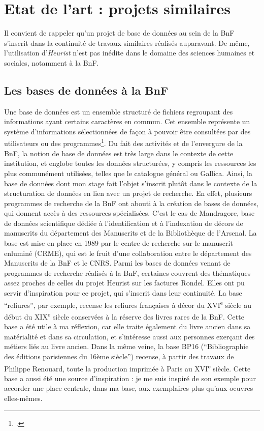 \chapter{Etat de l'art : projets similaires}

Il convient de rappeler qu'un projet de base de données au sein de la BnF s'inscrit dans la continuité de travaux similaires réalisés auparavant. De même, l'utilisation d'\emph{Heurist} n'est pas inédite dans le domaine des sciences humaines et sociales, notamment à la BnF. 


\section{Les bases de données à la BnF}

Une base de données est un ensemble structuré de fichiers regroupant des informations ayant certains caractères en commun. Cet ensemble représente un système d'informations sélectionnées de façon à pouvoir être consultées par des utilisateurs ou des programmes\footcite{BDD_def}. Du fait des activités et de l'envergure de la BnF, la notion de base de données est très large dans le contexte de cette institution, et englobe toutes les données structurées, y compris les ressources les plus communément utilisées, telles que le catalogue général ou Gallica.  
Ainsi, la base de données dont mon stage fait l'objet s'inscrit plutôt dans le contexte de la structuration de données en lien avec un projet de recherche. En effet, plusieurs programmes de recherche de la BnF ont abouti à la création de bases de données, qui donnent accès à des ressources spécialisées. C'est le cas de Mandragore, base de données scientifique dédiée à l’identification et à l'indexation de décors de manuscrits du département des Manuscrits et de la Bibliothèque de l’Arsenal. La base est mise en place en 1989 par le centre de recherche sur le manuscrit enluminé (CRME), qui est le fruit d'une collaboration entre le département des Manuscrits de la BnF et le CNRS. 
Parmi les bases de données venant de programmes de recherche réalisés à la BnF, certaines couvrent des thématiques assez proches de celles du projet Heurist sur les factures Rondel. Elles ont pu servir d'inspiration pour ce projet, qui s'inscrit dans leur continuité. La base \enquote{reliures}, par exemple, recense les reliures françaises à décor du XVI\textsuperscript{e} siècle au début du XIX\textsuperscript{e} siècle conservées à la réserve des livres rares de la BnF. Cette base a été utile à ma réflexion, car elle traite également du livre ancien dans sa matérialité et dans sa circulation, et s'intéresse aussi aux personnes exerçant des métiers liés au livre ancien. Dans la même veine, la base BP16 (\enquote{Bibliographie des éditions parisiennes du 16ème siècle}) recense, à partir des travaux de Philippe Renouard, toute la production imprimée à Paris au XVI\textsuperscript{e} siècle. Cette base a aussi été une source d'inspiration : je me suis inspiré de son exemple pour accorder une place centrale, dans ma base, aux exemplaires plus qu'aux oeuvres elles-mêmes. 
